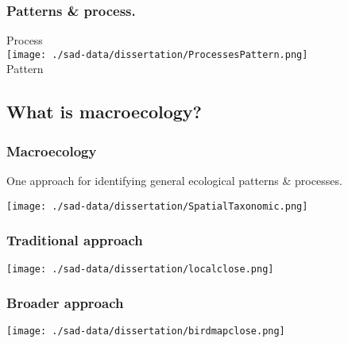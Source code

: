 \documentclass[14pt]{beamer}
\begin{document}
\begin{frame}
\frametitle{Patterns \& process.}
\begin{Large}
\begin{center}
Process\\ 
\texttt{[image: ./sad-data/dissertation/ProcessesPattern.png]}\\
Pattern\\
\end{center}
\end{Large}
\end{frame}

\subsection{What is macroecology?}
\begin{frame}[t]
\frametitle{Macroecology}
\normalsize One approach for identifying general ecological patterns \& processes.
\begin{center}
\texttt{[image: ./sad-data/dissertation/SpatialTaxonomic.png]}
\end{center}
\end{frame}


\begin{frame}[t]
\frametitle{Traditional approach}
\vspace{-7pt}
\begin{center}
\texttt{[image: ./sad-data/dissertation/localclose.png]}
\end{center}
\end{frame}


\begin{frame}[t]
\frametitle{Broader approach}
\vspace{-7pt}
\begin{center}
\texttt{[image: ./sad-data/dissertation/birdmapclose.png]}
\end{center}
\end{frame}
\end{document}
